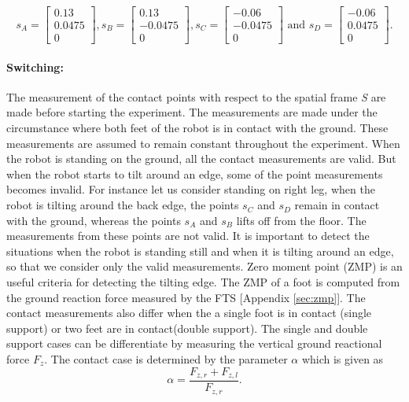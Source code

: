  $$ s_A = \begin{bmatrix} 0.13 \\ 0.0475 \\ 0 \end{bmatrix} , 
    s_B = \begin{bmatrix} 0.13 \\ -0.0475 \\ 0 \end{bmatrix},
    s_C = \begin{bmatrix} -0.06 \\ -0.0475 \\ 0 \end{bmatrix} \text{ and }
    s_D = \begin{bmatrix} -0.06 \\ 0.0475 \\ 0 \end{bmatrix}.$$

\paragraph{Switching:} The measurement of the contact points with respect to the spatial frame \emph{S} are made before starting the experiment. The measurements are made under the circumstance where both feet of the robot is in contact with the ground. These measurements are assumed to remain constant throughout the experiment. When the robot is standing on the ground, all the contact measurements are valid. But when the robot starts to tilt around an edge, some of the point measurements becomes invalid. For instance let us consider standing on right leg, when the robot is tilting around the back edge, the points $s_{C}$ and $s_{D}$ remain in contact with the ground, whereas the points $s_{A}$ and $s_B$ lifts off from the floor. The measurements from these points are not valid. It is important to detect the situations when the robot is standing still and when it is tilting around an edge, so that we consider only the valid measurements. Zero moment point (ZMP) is an useful criteria for detecting the tilting edge. The ZMP of a foot is computed from the ground reaction force measured by the FTS [Appendix \ref{sec:zmp}]. The contact measurements also differ when the a single foot is in contact (single support) or two feet are in contact(double support). The single and double support cases can be differentiate by measuring the vertical ground reactional force $F_z$. The contact case is determined by the parameter $\alpha$ which is given as \citep{atk12} $$ \alpha = \frac{F_{z,r} + F_{z,l}}{F_{z,r}}.$$ 

